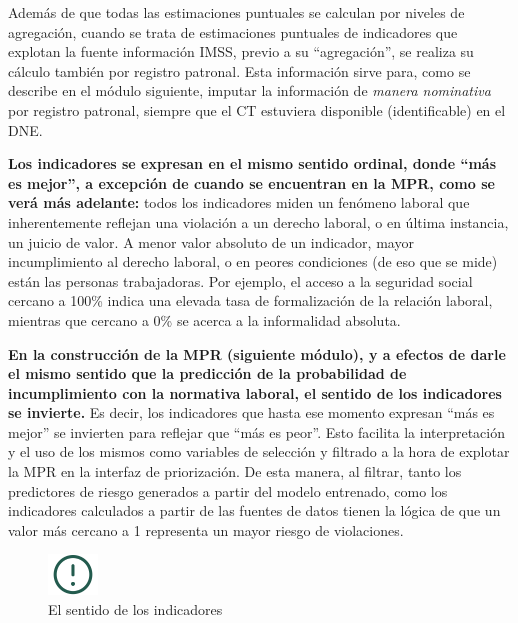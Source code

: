 \documentclass[
]{article}
\begin{document}
Además de que todas las estimaciones puntuales se calculan por niveles de agregación, cuando se trata de estimaciones puntuales de indicadores que explotan la fuente información IMSS, previo a su ``agregación'', se realiza su cálculo también por registro patronal. Esta información sirve para, como se describe en el módulo siguiente, imputar la información de \emph{manera nominativa} por registro patronal, siempre que el CT estuviera disponible (identificable) en el DNE.

\textbf{Los indicadores se expresan en el mismo sentido ordinal, donde ``más es mejor'', a excepción de cuando se encuentran en la MPR, como se verá más adelante:} todos los indicadores miden un fenómeno laboral que inherentemente reflejan una violación a un derecho laboral, o en última instancia, un juicio de valor. A menor valor absoluto de un indicador, mayor incumplimiento al derecho laboral, o en peores condiciones (de eso que se mide) están las personas trabajadoras. Por ejemplo, el acceso a la seguridad social cercano a 100\% indica una elevada tasa de formalización de la relación laboral, mientras que cercano a 0\% se acerca a la informalidad absoluta.

\textbf{En la construcción de la MPR (siguiente módulo), y a efectos de darle el mismo sentido que la predicción de la probabilidad de incumplimiento con la normativa laboral, el sentido de los indicadores se invierte.} Es decir, los indicadores que hasta ese momento expresan ``más es mejor'' se invierten para reflejar que ``más es peor''. Esto facilita la interpretación y el uso de los mismos como variables de selección y filtrado a la hora de explotar la MPR en la interfaz de priorización. De esta manera, al filtrar, tanto los predictores de riesgo generados a partir del modelo entrenado, como los indicadores calculados a partir de las fuentes de datos tienen la lógica de que un valor más cercano a 1 representa un mayor riesgo de violaciones.

\begin{figure}
\includegraphics[width=50px,style="float:left; background-color: #f5f5f5; padding-right:1em"]{images-1/important-icon} \caption{El sentido de los indicadores}\label{fig:sentidoindicadores}
\end{figure}
\end{document}
